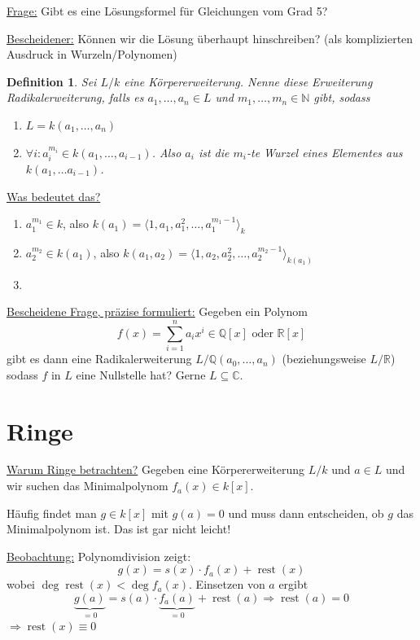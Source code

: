 \documentclass[a4paper,12pt,numbers=noenddot,parskip=full]{scrartcl}
\newcommand{\setN}{\mathbb{N}}
\newcommand{\setQ}{\mathbb{Q}}
\newcommand{\setR}{\mathbb{R}}
\newcommand{\setC}{\mathbb{C}}
\newcommand{\heading}{\underline}
\theoremstyle{dotless}
\newtheorem{definition}[theorem]{Definition}
\theoremstyle{remark}
\begin{document}
	\heading{Frage:} Gibt es eine Lösungsformel für Gleichungen vom Grad 5?
	
	\heading{Bescheidener:} Können wir die Lösung überhaupt hinschreiben? (als komplizierten Ausdruck in Wurzeln/Polynomen)
	
	\begin{definition}
		Sei $L/k$ eine Körpererweiterung. Nenne diese Erweiterung Radikalerweiterung, falls es $a_1, \dots, a_n \in L$ und $m_1, \dots, m_n \in \setN$ gibt, sodass
		\begin{enumerate}
			\item $L = k(a_1, \dots, a_n)$
			\item $\forall i : a_i^{m_i} \in k(a_1, \dots, a_{i-1})$. Also $a_i$ ist die $m_i$-te Wurzel eines Elementes aus $k(a_1, \dots a_{i-1})$.
		\end{enumerate}
	\end{definition}

	\heading{Was bedeutet das?}
	\begin{enumerate}
		\item $a_1^{m_1} \in k$, also $k(a_1) = \langle 1 , a_1, a_1^2, \dots, a_1^{m_1 - 1} \rangle_k$
		\item $a_2^{m_2} \in k(a_1)$, also $k(a_1, a_2) = \langle 1 , a_2, a_2^2, \dots, a_2^{m_2 - 1} \rangle_{k(a_1)}$
		\item \textellipsis
	\end{enumerate}

	\heading{Bescheidene Frage, präzise formuliert:} Gegeben ein Polynom
	\begin{equation*}
		f(x) = \sum_{i=1}^{n} a_i x^i \in \setQ[x] \text{ oder } \setR[x]
	\end{equation*}
	gibt es dann eine Radikalerweiterung $L/\setQ(a_0, \dots, a_n)$ (beziehungsweise $L/\setR$) sodass $f$ in $L$ eine Nullstelle hat? Gerne $L \subseteq \setC$.
	
	\section{Ringe}
	
	\heading{Warum Ringe betrachten?} Gegeben eine Körpererweiterung $L/k$ und $a \in L$ und wir suchen das Minimalpolynom $f_a(x) \in k[x]$.
	
	Häufig findet man $g \in k[x]$ mit $g(a) = 0$ und muss dann entscheiden, ob $g$ das Minimalpolynom ist. Das ist gar nicht leicht!
	
	\heading{Beobachtung:} Polynomdivision zeigt:
	\begin{equation*}
		g(x) = s(x) \cdot f_a(x) + \operatorname{rest}(x)
	\end{equation*}
	wobei $\deg \operatorname{rest}(x) < \deg f_a(x)$. Einsetzen von $a$ ergibt
	\begin{equation*}
		\underbrace{g(a)}_{= 0} = s(a) \cdot \underbrace{f_a(a)}_{=0} + \operatorname{rest}(a) \Rightarrow \operatorname{rest}(a) = 0
 	\end{equation*}
 	$\Rightarrow \operatorname{rest}(x) \equiv 0$
 	
\end{document}
